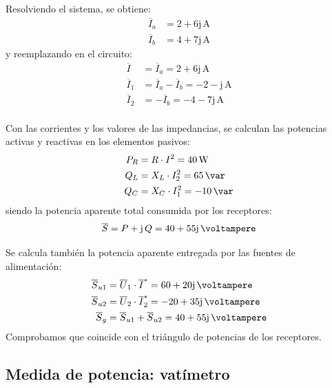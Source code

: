 \begin{example}
  \vspace{3mm} Resolviendo el sistema, se obtiene:
  \begin{align*}
    \overline{I}_a&= 2 + 6\mathrm{j}\,\unit{\ampere}\\
    \overline{I}_b&= 4 + 7\mathrm{j}\,\unit{\ampere}
  \end{align*}          
  y reemplazando en el circuito:
  \begin{align*}
    \overline{I}&=\overline{I}_a= 2 + 6\mathrm{j}\,\unit{\ampere}\\
    \overline{I}_1&=\overline{I}_a - \overline{I}_b= -2 -\mathrm{j}\,\unit{\ampere}\\
    \overline{I}_2&=-\overline{I}_b= -4 - 7\mathrm{j}\,\unit{\ampere}\\
  \end{align*}	

  \vspace{-3mm} Con las corrientes y los valores de las impedancias,
  se calculan las potencias activas y reactivas en los elementos
  pasivos:
  \begin{align*}
    P_R&=R\cdot I^2=\qty{40}{\watt}\\
    Q_L &= X_L\cdot I_2^2=\qty{65}{\var}\\
    Q_C&=X_C\cdot I_1^2=-\qty{10}{\var}
  \end{align*}
  siendo la potencia aparente total consumida por los receptores:
  \begin{equation*}
    \overline{S}=P+\mathrm{j}\,Q= 40 + 55\mathrm{j}\,\unit{\voltampere}
  \end{equation*}
		
  Se calcula también la potencia aparente entregada por las fuentes de
  alimentación:
  \begin{align*}
    \overline{S}_{u1}&=\overline{U}_1\cdot \overline{I}^*= 60 + 20\mathrm{j}\,\unit{\voltampere}\\
    \overline{S}_{u2}&=\overline{U}_2\cdot \overline{I}_2^*= -20 + 35\mathrm{j}\,\unit{\voltampere}\\
    \overline{S}_g &= \overline{S}_{u1} + \overline{S}_{u2} = 40 + 55\mathrm{j}\,\unit{\voltampere}
  \end{align*}
  Comprobamos que coincide con el triángulo de potencias de los
  receptores.
                        
\end{example}
	
\subsection{Medida de potencia: vatímetro}\label{sec:medida_potencia}
	
